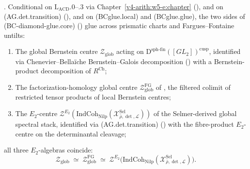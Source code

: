 \begin{theorem}
\label{v4-arith:w6-g:thm:bcglue-across-charts}
\ClaimStatusProvedHereConditional. Conditional on
\(\mathrm{L}_{\mathrm{ACD}}\).\(0\)--.\(3\) via
Chapter~\ref{v4-arith:w5-e:chapter}
(), and on (AG.det.transition)
(), and on (BCglue.local)
and (BCglue.glue),
the two sides of (BC-diamond-glue.core)
() glue across
prismatic charts and Fargues--Fontaine untilts:
\begin{enumerate}
\item The global Bernstein centre
\(\mathcal{Z}_{\mathrm{glob}}\) acting on
\(\mathrm{D}^{\mathrm{sph\text{-}fin}}([GL_{2}])^{\mathrm{cusp}}\),
identified via Chenevier--Bella\"iche Bernstein--Galois
decomposition
() with a
Bernstein-product decomposition of \(R^{\mathrm{Ch}}\);
\item The factorization-homology global centre
\(\mathcal{Z}^{\mathrm{FG}}_{\mathrm{glob}}\) of
, the filtered
colimit of restricted tensor products of local Bernstein centres;
\item The \(E_{2}\)-centre
\(\mathcal{Z}^{E_{2}}(\mathrm{IndCoh}_{\mathrm{Nilp}}(\mathcal{X}^{\mathrm{Sel}}_{\bar\rho,\det,\mathcal{L}}))\)
of the Selmer-derived global spectral stack, identified via
(AG.det.transition)
() with the fibre-product
\(E_{2}\)-centre on the determinantal cleavage;
\end{enumerate}
all three \(E_{2}\)-algebras coincide:
\begin{equation}
\label{v4-arith:w6-g:eq:three-centres-coincide}
\mathcal{Z}_{\mathrm{glob}}\;\simeq\;\mathcal{Z}^{\mathrm{FG}}_{\mathrm{glob}}\;\simeq\;\mathcal{Z}^{E_{2}}\bigl(\mathrm{IndCoh}_{\mathrm{Nilp}}(\mathcal{X}^{\mathrm{Sel}}_{\bar\rho,\det,\mathcal{L}})\bigr).
\end{equation}
\end{theorem}


